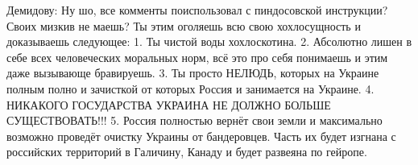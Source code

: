 Демидову:
Ну шо, все комменты поиспользовал с пиндосовской инструкции? Своих мизкив не маешь? Ты этим оголяешь всю свою хохлосущность и доказываешь следующее:
1. Ты чистой воды хохлоскотина.
2. Абсолютно лишен в себе всех человеческих моральных норм, всё это про себя понимаешь и этим даже вызывающе бравируешь.
3. Ты просто НЕЛЮДЬ, которых на Украине полным полно и зачисткой от которых Россия и занимается на Украине.
4. НИКАКОГО ГОСУДАРСТВА УКРАИНА НЕ ДОЛЖНО БОЛЬШЕ СУЩЕСТВОВАТЬ!!!
5. Россия полностью вернёт свои земли и максимально возможно проведёт очистку Украины от бандеровцев. Часть их будет изгнана с российских территорий в Галичину, Канаду и будет развеяна по гейропе.
